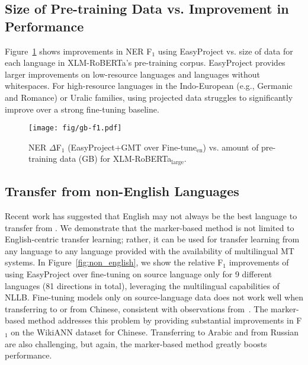 \documentclass[11pt,dvipsnames]{article}
\begin{document}
\subsection{Size of Pre-training Data vs. Improvement in Performance}




\label{sec:pre-training-data-size}
Figure~\ref{fig:ner_gb} shows improvements in NER F$_1$  using EasyProject vs. size of data for each language in XLM-RoBERTa's pre-training corpus.
EasyProject provides larger improvements on low-resource languages and languages without whitespaces.
For high-resource languages in the Indo-European (e.g., Germanic and Romance) or Uralic families, using  projected data struggles to significantly improve over a strong fine-tuning baseline.



\begin{figure}[t!]
    \centering
\texttt{[image: fig/gb-f1.pdf]}
    \vspace{-7pt}
    \caption{NER $\Delta$F$_1$  (EasyProject+GMT over  Fine-tune$_{\text{en}}$) vs. amount of pre-training data (GB) for XLM-RoBERTa$_{\text{large}}$.}
    \label{fig:ner_gb}
    \vspace{-18pt}
\end{figure}



\vspace{-1pt}
\subsection{Transfer from non-English Languages}
\label{sec:multilingual}
Recent work has suggested that English may not always be the best language to transfer from \cite{turc2021revisiting}.
We demonstrate that the marker-based method is not limited to English-centric transfer learning; rather, it can be used for transfer learning from any language to any language provided with the availability of multilingual MT systems. In Figure~\ref{fig:non_english}, we show the relative F$_1$ improvements 
 of using EasyProject over fine-tuning  on source language only for 9 different languages (81 directions in total), leveraging the multilingual capabilities of NLLB. Fine-tuning models only on source-language data  does not work well when transferring to or from Chinese, consistent with observations from~\citet{hu2020xtreme}. 
The marker-based method addresses this problem by providing substantial improvements in F$_1$ on the WikiANN dataset for Chinese. Transferring to Arabic and from Russian are also challenging, but again, the marker-based method greatly boosts performance.
\end{document}

